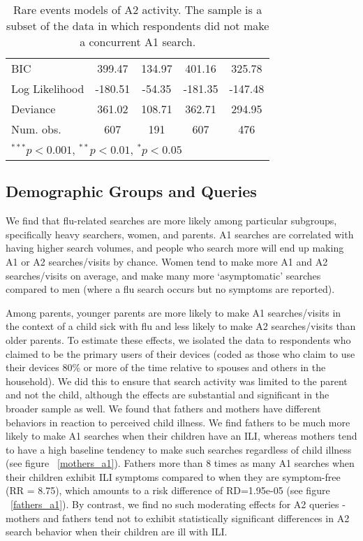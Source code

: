 \documentclass[12pt]{article}
\begin{document}
\begin{table}
\begin{center}
\begin{tabular}{l c c c c }
BIC            & 399.47         & 134.97         & 401.16         & 325.78         \\
Log Likelihood & -180.51        & -54.35         & -181.35        & -147.48        \\
Deviance       & 361.02         & 108.71         & 362.71         & 294.95         \\
Num. obs.      & 607            & 191            & 607            & 476            \\
\hline
\multicolumn{5}{l}{\scriptsize{$^{***}p<0.001$, $^{**}p<0.01$, $^*p<0.05$}}
\end{tabular}
\caption{Rare events models of A2 activity. The sample is a subset of the data in which respondents did not make a concurrent A1 search.}
\label{table:coefficients_a2}
\end{center}
\end{table}

\subsection{Demographic Groups and Queries}

We find that flu-related searches are more likely among particular subgroups, specifically heavy searchers, women, and parents. A1 searches are correlated with having higher search volumes, and people who search more will end up making A1 or A2 searches/visits by chance. Women tend to make more A1 and A2 searches/visits on average, and make many more `asymptomatic' searches compared to men (where a flu search occurs but no symptoms are reported). 

Among parents, younger parents are more likely to make A1 searches/visits in the context of a child sick with flu and less likely to make A2 searches/visits than older parents. To estimate these effects, we isolated the data to respondents who claimed to be the primary users of their devices (coded as those who claim to use their devices 80\% or more of the time relative to spouses and others in the household). We did this to ensure that search activity was limited to the parent and not the child, although the effects are substantial and significant in the broader sample as well. We found that fathers and mothers have different behaviors in reaction to perceived child illness. We find fathers to be much more likely to make A1 searches when their children have an ILI, whereas mothers tend to have a high baseline tendency to make such searches regardless of child illness (see figure ~\ref{mothers_a1}). Fathers more than 8 times as many A1 searches when their children exhibit ILI symptoms compared to when they are symptom-free (RR = 8.75), which amounts to a risk difference of RD=1.95e-05 (see figure ~\ref{fathers_a1}). By contrast, we find no such moderating effects for A2 queries - mothers and fathers tend not to exhibit statistically significant differences in A2 search behavior when their children are ill with ILI.  
\end{document}
